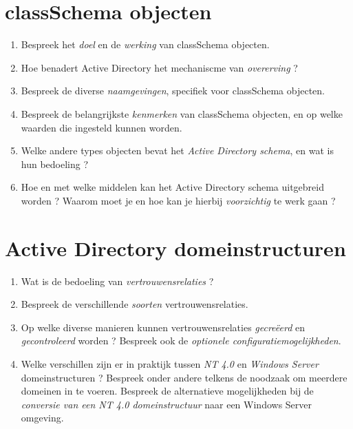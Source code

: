 \documentclass{report}
\begin{document}
	\section{classSchema objecten }
	\begin{enumerate}
		\item Bespreek het \textit{doel} en de \textit{werking} van classSchema objecten.
		
		\item Hoe benadert Active Directory het mechaniscme van \textit{overerving} ?
		
		\item Bespreek de diverse \textit{naamgevingen}, specifiek voor classSchema objecten.
		
		\item Bespreek de belangrijkste \textit{kenmerken} van classSchema objecten, en op welke waarden die ingesteld kunnen worden.
		
		\item Welke andere types objecten bevat het \textit{Active Directory schema}, en wat is hun bedoeling ? 
		
		\item Hoe en met welke middelen kan het Active Directory schema uitgebreid worden ? Waarom moet je en hoe kan je hierbij \textit{voorzichtig} te werk gaan ? 
	\end{enumerate}

 	\section{Active Directory domeinstructuren }
 	\begin{enumerate}
 		\item Wat is de bedoeling van \textit{vertrouwensrelaties} ?
 		
 		\item Bespreek de verschillende \textit{soorten} vertrouwensrelaties.
 		
 		\item Op welke diverse manieren kunnen vertrouwensrelaties \textit{gecreëerd} en \textit{gecontroleerd} worden ? Bespreek ook de \textit{optionele configuratiemogelijkheden}.
 		
 		\item Welke verschillen zijn er in praktijk tussen \textit{NT 4.0} en \textit{Windows Server} domeinstructuren ? Bespreek onder andere telkens de noodzaak om meerdere domeinen in te voeren. Bespreek de alternatieve mogelijkheden bij de \textit{conversie van een NT 4.0 domeinstructuur} naar een Windows Server omgeving.
 	\end{enumerate}
 
\end{document}
